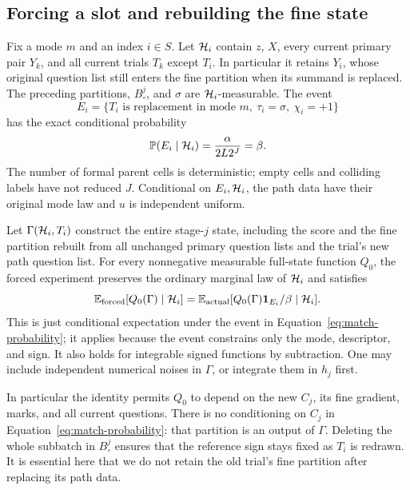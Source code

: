 \subsection{Forcing a slot and rebuilding the fine state}

Fix a mode $m$ and an index $i\in S$. Let $\mathcal H_i$ contain $z$, $X$,
every current primary pair $Y_k$, and all current trials $T_k$ except
$T_i$. In particular it retains $Y_i$, whose original question list
still enters the fine partition when its summand is replaced.
The preceding partitions, $B_\circ^j$, and $\sigma$ are
$\mathcal H_i$-measurable. The event
\[
 E_i=\{T_i\text{ is replacement in mode }m,
                  \ \tau_i=\sigma,\ \chi_i=+1\}
\]
has the exact conditional probability
\begin{equation}\label{eq:match-probability}
 \mathbb P(E_i\mid\mathcal H_i)=\frac\alpha{2L2^J}=\beta.
\end{equation}
The number of formal parent cells is deterministic; empty cells and
colliding labels have not reduced $J$. Conditional on $E_i,\mathcal H_i$, the
path data have their original mode law and $u$ is independent uniform.

Let $\Gamma(\mathcal H_i,T_i)$ construct the entire stage-$j$ state, including
the score and the fine partition rebuilt from all unchanged primary
question lists and the trial's new path question list. For every
nonnegative measurable full-state function $Q_0$, the forced experiment
preserves the ordinary marginal law of $\mathcal H_i$ and satisfies
\begin{equation}\label{eq:full-state-forcing}
 \mathbb E_{\rm forced}[Q_0(\Gamma)\mid\mathcal H_i]
 =\mathbb E_{\rm actual}
       [Q_0(\Gamma)\mathbf 1_{E_i}/\beta\mid\mathcal H_i].
\end{equation}
This is just conditional expectation under the event in
Equation~\ref{eq:match-probability}; it applies because the event
constrains only the mode, descriptor, and sign. It also holds for
integrable signed functions by subtraction. One may include independent
numerical noises in $\Gamma$, or integrate them in $h_j$ first.

In particular the identity permits $Q_0$ to depend on the new $C_j$,
its fine gradient, marks, and all current questions. There is no
conditioning on $C_j$ in Equation~\ref{eq:match-probability}: that
partition is an output of $\Gamma$. Deleting the whole subbatch in
$B_\circ^j$ ensures that the reference sign stays fixed as $T_i$ is
redrawn. It is essential here that we do not retain the old trial's fine
partition after replacing its path data.

